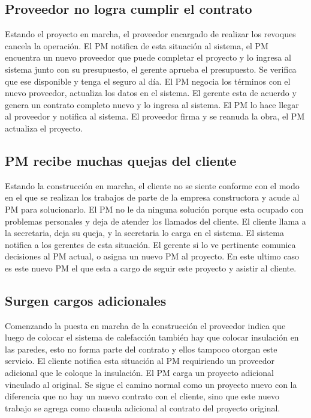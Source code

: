 \documentclass{article}
\theoremstyle{definition}
\theoremstyle{remark}
\begin{document}
\subsection{Proveedor no logra cumplir el contrato}
Estando el proyecto en marcha, el proveedor encargado de realizar los revoques cancela la operación. El PM notifica de esta situación al sistema, el PM encuentra un nuevo proveedor que puede completar el proyecto y lo ingresa al sistema junto con su presupuesto, el gerente aprueba el presupuesto. Se verifica que ese disponible y tenga el seguro al día. El PM negocia los términos con el nuevo proveedor, actualiza los datos en el sistema. El gerente esta de acuerdo y genera un contrato completo nuevo y lo ingresa al sistema. El PM lo hace llegar al proveedor y notifica al sistema. El proveedor firma y se reanuda la obra, el PM actualiza el proyecto.

\subsection{PM recibe muchas quejas del cliente}
Estando la construcción en marcha, el cliente no se siente conforme con el modo en el que se realizan los trabajos de parte de la empresa constructora y acude al PM para solucionarlo. El PM no le da ninguna solución porque esta ocupado con problemas personales y deja de atender los llamados del cliente. El cliente llama a la secretaria, deja su queja, y la secretaria lo carga en el sistema. El sistema notifica a los gerentes de esta situación. El gerente si lo ve pertinente comunica decisiones al PM actual, o asigna un nuevo PM al proyecto. En este ultimo caso es este nuevo PM el que esta a cargo de seguir este proyecto y asistir al cliente.

\subsection{Surgen cargos adicionales}
Comenzando la puesta en marcha de la construcción el proveedor indica que luego de colocar el sistema de calefacción también hay que colocar insulación en las paredes, esto no forma parte del contrato y ellos tampoco otorgan este servicio. El cliente notifica esta situación al PM requiriendo un proveedor adicional que le coloque la insulación. El PM carga un proyecto adicional vinculado al original. Se sigue el camino normal como un proyecto nuevo con la diferencia que no hay un nuevo contrato con el cliente, sino que este nuevo trabajo se agrega como clausula adicional al contrato del proyecto original.
\end{document}

